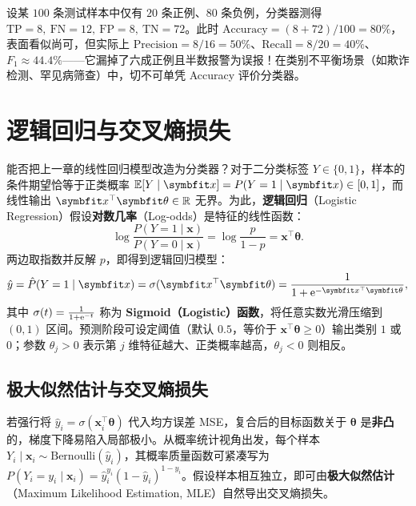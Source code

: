 \begin{pitfall}[类别不平衡时的准确率陷阱]\label{pit:accuracy-imbalance}
设某 $100$ 条测试样本中仅有 $20$ 条正例、$80$ 条负例，分类器测得 $\mathrm{TP}=8,\ \mathrm{FN}=12,\ \mathrm{FP}=8,\ \mathrm{TN}=72$。此时 $\mathrm{Accuracy} = (8+72)/100 = 80\%$，表面看似尚可，但实际上 $\mathrm{Precision} = 8/16 = 50\%$、$\mathrm{Recall} = 8/20 = 40\%$、$F_1 \approx 44.4\%$——它漏掉了六成正例且半数报警为误报！在类别不平衡场景（如欺诈检测、罕见病筛查）中，切不可单凭 Accuracy 评价分类器。
\end{pitfall}

\section{逻辑回归与交叉熵损失}\label{sec:logistic-regression}

能否把上一章的线性回归模型改造为分类器？对于二分类标签 $Y\in\{0,1\}$，样本的条件期望恰等于正类概率 $\E[Y\mid \bm{x}] = P(Y=1\mid \bm{x}) \in [0, 1]$，而线性输出 $\bm{x}^\top\bm{\theta}\in\R$ 无界。为此，\textbf{逻辑回归}（Logistic Regression）假设\textbf{对数几率}（Log-odds）是特征的线性函数：
\[
  \log\frac{P(Y=1\mid \bm{x})}{P(Y=0\mid \bm{x})} = \log\frac{p}{1-p} = \bm{x}^\top\bm{\theta}.
\]
两边取指数并反解 $p$，即得到逻辑回归模型：
\begin{equation}\label{eq:logistic-model}
  \hat{y} = \hat{P}(Y=1\mid \bm{x}) = \sigma(\bm{x}^\top\bm{\theta}) = \frac{1}{1 + \e^{-\bm{x}^\top\bm{\theta}}},
\end{equation}
其中 $\sigma(t) = \frac{1}{1+\mathrm{e}^{-t}}$ 称为 \textbf{Sigmoid（Logistic）函数}，将任意实数光滑压缩到 $(0, 1)$ 区间。预测阶段可设定阈值（默认 $0.5$，等价于 $\bm{x}^\top\bm{\theta}\ge 0$）输出类别 $1$ 或 $0$；参数 $\theta_j > 0$ 表示第 $j$ 维特征越大、正类概率越高，$\theta_j < 0$ 则相反。

\subsection{极大似然估计与交叉熵损失}

若强行将 $\hat{y}_i = \sigma(\bm{x}_i^\top\bm{\theta})$ 代入均方误差 MSE，复合后的目标函数关于 $\bm{\theta}$ 是\textbf{非凸}的，梯度下降易陷入局部极小。从概率统计视角出发，每个样本 $Y_i\mid \bm{x}_i \sim \mathrm{Bernoulli}(\hat{y}_i)$，其概率质量函数可紧凑写为 $P(Y_i = y_i \mid \bm{x}_i) = \hat{y}_i^{y_i}(1-\hat{y}_i)^{1-y_i}$。假设样本相互独立，即可由\textbf{极大似然估计}（Maximum Likelihood Estimation, MLE）自然导出交叉熵损失。

